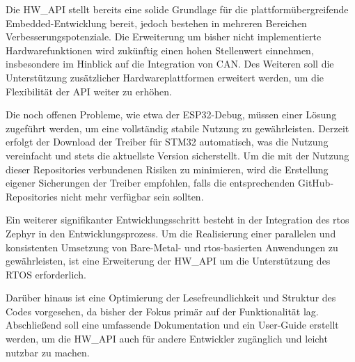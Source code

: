 
Die HW\_API stellt bereits eine solide Grundlage für die plattformübergreifende Embedded-Entwicklung bereit, jedoch bestehen in mehreren Bereichen Verbesserungspotenziale. 
Die Erweiterung um bisher nicht implementierte Hardwarefunktionen wird zukünftig einen hohen Stellenwert einnehmen, insbesondere im Hinblick auf die Integration von CAN. 
Des Weiteren soll die Unterstützung zusätzlicher Hardwareplattformen erweitert werden, um die Flexibilität der API weiter zu erhöhen.

Die noch offenen Probleme, wie etwa der ESP32-Debug, müssen einer Lösung zugeführt werden, um eine vollständig stabile Nutzung zu gewährleisten.
Derzeit erfolgt der Download der Treiber für STM32 automatisch, was die Nutzung vereinfacht und stets die aktuellste Version sicherstellt. 
Um die mit der Nutzung dieser Repositories verbundenen Risiken zu minimieren, wird die Erstellung eigener Sicherungen der Treiber empfohlen, falls die entsprechenden GitHub-Repositories nicht mehr verfügbar sein sollten.

Ein weiterer signifikanter Entwicklungsschritt besteht in der Integration des \gls{rtos} Zephyr in den Entwicklungsprozess. 
Um die Realisierung einer parallelen und konsistenten Umsetzung von Bare-Metal- und \gls{rtos}-basierten Anwendungen zu gewährleisten, ist eine Erweiterung der HW\_API um die Unterstützung des RTOS erforderlich.

Darüber hinaus ist eine Optimierung der Lesefreundlichkeit und Struktur des Codes vorgesehen, da bisher der Fokus primär auf der Funktionalität lag.
Abschließend soll eine umfassende Dokumentation und ein User-Guide erstellt werden, um die HW\_API auch für andere Entwickler zugänglich und leicht nutzbar zu machen.